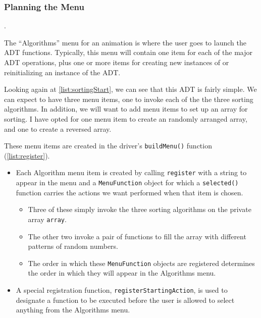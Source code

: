 \documentclass[11pt,titlepage]{book}
\begin{document}
\subsubsection{Planning the Menu}\label{buildMenu}.

The ``Algorithms'' menu for an animation is where the user goes to
launch the ADT functions.  Typically, this menu will contain one item
for each of the major ADT operations, plus one or more items for
creating new instances of or reinitializing an instance of the ADT.

Looking again at \autoref{list:sortingStart}, we can see that this ADT
is fairly simple. We can expect to have three menu items, one to
invoke each of the the three sorting algorithms. In addition, we will
want to add menu items to set up an array for sorting. I have opted
for one menu item to create an randomly arranged array, and one to
create a reversed array.


These menu items are created in the driver's \texttt{buildMenu()} function (\autoref{list:register}).

\begin{itemize}
\item Each Algorithm menu item is created by calling \texttt{register}
  with a string to appear in the menu and a \texttt{MenuFunction}
  object for which a \texttt{selected()} function carries the actions
  we want performed when that item is chosen.
  \begin{itemize}
    \item Three of these simply invoke the three sorting algorithms 
      on the private array \texttt{array}.
    \item The other two invoke a pair of functions to fill the array with
      different patterns of random numbers.
    \item The order in which these \texttt{MenuFunction} objects are
      registered determines the order in which they will appear in the
      Algorithms menu.
  \end{itemize}

\item A special registration function, \texttt{registerStartingAction}, is used
  to designate a function to be executed before the user is allowed 
  to select anything from the Algorithms menu.
\end{itemize}
\end{document}

